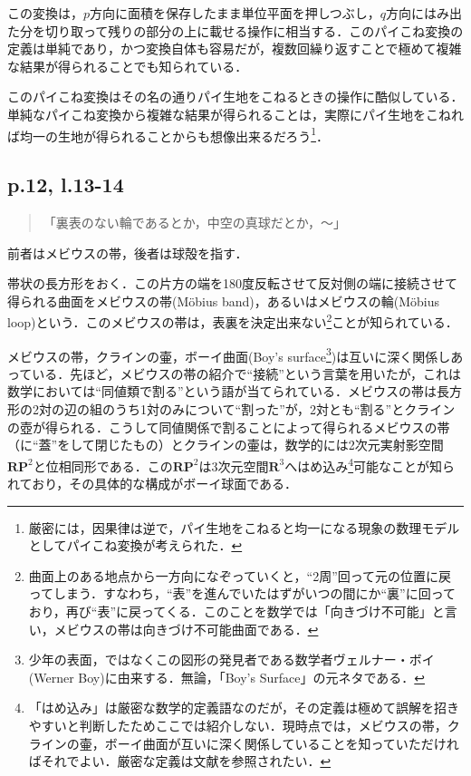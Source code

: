 \documentclass[10pt, a5paper, twoside]{jsarticle}
\theoremstyle{definition}
\begin{document}
		この変換は，$p$方向に面積を保存したまま単位平面を押しつぶし，$q$方向にはみ出た分を切り取って残りの部分の上に載せる操作に相当する\cite{pie}．このパイこね変換の定義は単純であり，かつ変換自体も容易だが，複数回繰り返すことで極めて複雑な結果が得られることでも知られている\cite{yama}．

		このパイこね変換はその名の通りパイ生地をこねるときの操作に酷似している．単純なパイこね変換から複雑な結果が得られることは，実際にパイ生地をこねれば均一の生地が得られることからも想像出来るだろう\footnote{厳密には，因果律は逆で，パイ生地をこねると均一になる現象の数理モデルとしてパイこね変換が考えられた．}．

		\subsection{p.12, l.13-14}

		\begin{quote}
			
			「裏表のない輪であるとか，中空の真球だとか，〜」

		\end{quote}

		前者はメビウスの帯，後者は球殻を指す．

		帯状の長方形をおく．この片方の端を180度反転させて反対側の端に接続させて得られる曲面をメビウスの帯(Möbius band)，あるいはメビウスの輪(Möbius loop)という．このメビウスの帯は，表裏を決定出来ない\footnote{曲面上のある地点から一方向になぞっていくと，“2周”回って元の位置に戻ってしまう．すなわち，“表”を進んでいたはずがいつの間にか“裏”に回っており，再び“表”に戻ってくる．このことを数学では「向きづけ不可能」と言い，メビウスの帯は向きづけ不可能曲面である．}ことが知られている．

		メビウスの帯，クラインの壷，ボーイ曲面(Boy's surface\footnote{少年の表面，ではなくこの図形の発見者である数学者ヴェルナー・ボイ(Werner Boy)に由来する．無論，「Boy's Surface」の元ネタである．})は互いに深く関係しあっている．先ほど，メビウスの帯の紹介で“接続”という言葉を用いたが，これは数学においては“同値類で割る”という語が当てられている．メビウスの帯は長方形の2対の辺の組のうち1対のみについて“割った”が，2対とも“割る”とクラインの壺が得られる．こうして同値関係で割ることによって得られるメビウスの帯（に“蓋”をして閉じたもの）とクラインの壷は，数学的には2次元実射影空間$\bm{RP}^2$と位相同形である．この$\bm{RP}^2$は3次元空間$\bm{R}^3$へはめ込み\footnote{「はめ込み」は厳密な数学的定義語なのだが，その定義は極めて誤解を招きやすいと判断したためここでは紹介しない．現時点では，メビウスの帯，クラインの壷，ボーイ曲面が互いに深く関係していることを知っていただければそれでよい．厳密な定義は文献\cite{mat}を参照されたい．}可能なことが知られており，その具体的な構成がボーイ球面である．
\end{document}
